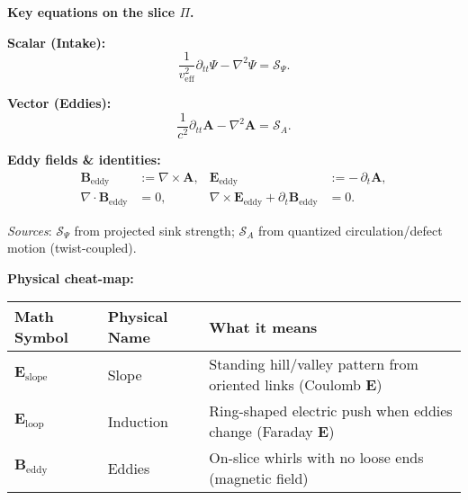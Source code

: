 \begin{tcolorbox}
\textbf{Key equations on the slice $\Pi$.}

\noindent\textbf{Scalar (Intake):}
\begin{equation}
\frac{1}{v_{\text{eff}}^{2}}\partial_{tt}\Psi - \nabla^{2}\Psi = \mathcal S_{\Psi}.
\label{eq:scalar-fw}
\end{equation}

\noindent\textbf{Vector (Eddies):}
\begin{equation}
\frac{1}{c^{2}}\partial_{tt}\mathbf A - \nabla^{2}\mathbf A = \boldsymbol{\mathcal S}_{A}.
\label{eq:vector-fw}
\end{equation}

\noindent\textbf{Eddy fields \& identities:}
\begin{subequations}\label{eq:eddy-block}
\begin{align}
\mathbf B_{\text{eddy}} &:= \nabla\times\mathbf A,
&
\mathbf E_{\text{eddy}} &:= -\,\partial_t \mathbf A,
\label{eq:eddy-fields}
\\
\nabla\!\cdot\!\mathbf B_{\text{eddy}} &= 0,
&
\nabla\times\mathbf E_{\text{eddy}}+\partial_t \mathbf B_{\text{eddy}} &= 0.
\label{eq:homogeneous-eddy}
\end{align}
\end{subequations}

\noindent\textit{Sources}: $\mathcal S_{\Psi}$ from projected sink strength;
$\boldsymbol{\mathcal S}_{A}$ from quantized circulation/defect motion (twist-coupled).
\end{tcolorbox}

\noindent\textbf{Physical cheat-map:}
\begin{center}
\begin{tabularx}{\linewidth}{|l|l|X|}
\hline
\textbf{Math Symbol} & \textbf{Physical Name} & \textbf{What it means} \\
\hline
$\mathbf{E}_{\text{slope}}$ & Slope & Standing hill/valley pattern from oriented links (Coulomb $\mathbf{E}$) \\
\hline
$\mathbf{E}_{\text{loop}}$ & Induction & Ring-shaped electric push when eddies change (Faraday $\mathbf{E}$) \\
\hline
$\mathbf{B}_{\text{eddy}}$ & Eddies & On-slice whirls with no loose ends (magnetic field) \\
\hline
\end{tabularx}
\end{center}

